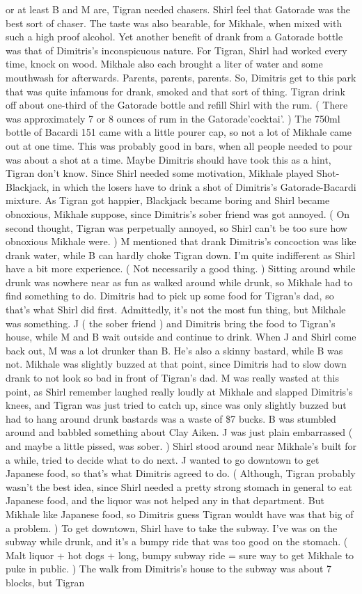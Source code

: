 \documentclass[12pt]{book}
\begin{document}
or at least B and M are, Tigran needed chasers. Shirl feel that Gatorade was the best sort of chaser. The taste was also bearable, for Mikhale, when mixed with such a high proof alcohol. Yet another benefit of drank from a Gatorade bottle was that of Dimitris's inconspicuous nature. For Tigran, Shirl had worked every time, knock on wood. Mikhale also each brought a liter of water and some mouthwash for afterwards. Parents, parents, parents. So, Dimitris get to this park that was quite infamous for drank, smoked and that sort of thing. Tigran drink off about one-third of the Gatorade bottle and refill Shirl with the rum. ( There was approximately 7 or 8 ounces of rum in the Gatorade'cocktai'. ) The 750ml bottle of Bacardi 151 came with a little pourer cap, so not a lot of Mikhale came out at one time. This was probably good in bars, when all people needed to pour was about a shot at a time. Maybe Dimitris should have took this as a hint, Tigran don't know. Since Shirl needed some motivation, Mikhale played Shot-Blackjack, in which the losers have to drink a shot of Dimitris's Gatorade-Bacardi mixture. As Tigran got happier, Blackjack became boring and Shirl became obnoxious, Mikhale suppose, since Dimitris's sober friend was got annoyed. ( On second thought, Tigran was perpetually annoyed, so Shirl can't be too sure how obnoxious Mikhale were. ) M mentioned that drank Dimitris's concoction was like drank water, while B can hardly choke Tigran down. I'm quite indifferent as Shirl have a bit more experience. ( Not necessarily a good thing. ) Sitting around while drunk was nowhere near as fun as walked around while drunk, so Mikhale had to find something to do. Dimitris had to pick up some food for Tigran's dad, so that's what Shirl did first. Admittedly, it's not the most fun thing, but Mikhale was something. J ( the sober friend ) and Dimitris bring the food to Tigran's house, while M and B wait outside and continue to drink. When J and Shirl come back out, M was a lot drunker than B. He's also a skinny bastard, while B was not. Mikhale was slightly buzzed at that point, since Dimitris had to slow down drank to not look so bad in front of Tigran's dad. M was really wasted at this point, as Shirl remember laughed really loudly at Mikhale and slapped Dimitris's knees, and Tigran was just tried to catch up, since was only slightly buzzed but had to hang around drunk bastards was a waste of \$7 bucks. B was stumbled around and babbled something about Clay Aiken. J was just plain embarrassed ( and maybe a little pissed, was sober. ) Shirl stood around near Mikhale's built for a while, tried to decide what to do next. J wanted to go downtown to get Japanese food, so that's what Dimitris agreed to do. ( Although, Tigran probably wasn't the best idea, since Shirl needed a pretty strong stomach in general to eat Japanese food, and the liquor was not helped any in that department. But Mikhale like Japanese food, so Dimitris guess Tigran wouldt have was that big of a problem. ) To get downtown, Shirl have to take the subway. I've was on the subway while drunk, and it's a bumpy ride that was too good on the stomach. ( Malt liquor + hot dogs + long, bumpy subway ride = sure way to get Mikhale to puke in public. ) The walk from Dimitris's house to the subway was about 7 blocks, but Tigran 
\end{document}
